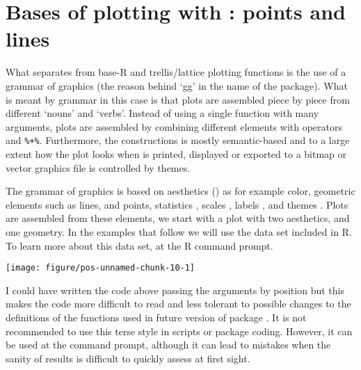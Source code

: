 \documentclass[paper=a4,10pt,div=17,headsepline,BCOR=12mm,twoside,open=right]{scrbook}\usepackage{knitr}
\begin{document}
\section{Bases of plotting with \ggplot: points and lines}

What separates \ggplot from base-R and trellis/lattice plotting functions is the use of a grammar of graphics (the reason behind `gg' in the name of the package). What is meant by grammar in this case is that plots are assembled piece by piece from different `nouns' and `verbs'. Instead of using a single function with many arguments, plots are assembled by combining different elements with operators \code{+} and \verb|%+%|. Furthermore, the constructions is mostly semantic-based and to a large extent how the plot looks when is printed, displayed or exported to a bitmap or vector graphics file is controlled by themes.

The grammar of graphics is based on aesthetics () as for example color, geometric elements  such as lines, and points, statistics , scales , labels , and themes . Plots are assembled from these elements, we start with a plot with two aesthetics, and one geometry. In the examples that follow we will use the  data set included in R. To learn more about this data set,  at the R command prompt.

\begin{knitrout}\footnotesize
{}\color{fgcolor}\begin{kframe}
\begin{alltt}
\hlstd{(}  \hlstd{(}    \hlopt{+}
  \hlstd{()}
\end{alltt}
\end{kframe}

{\centering \texttt{[image: figure/pos-unnamed-chunk-10-1]} 

}



\end{knitrout}

I could have written the code above passing the arguments by position but this
makes the code more difficult to read and less tolerant to possible changes to the
definitions of the functions used in future version of package \ggplot. It is not
recommended to use this terse style in scripts or package coding. However, it can
be used at the command prompt, although it can lead to mistakes when the sanity
of results is difficult to quickly assess at first sight.
\end{document}
